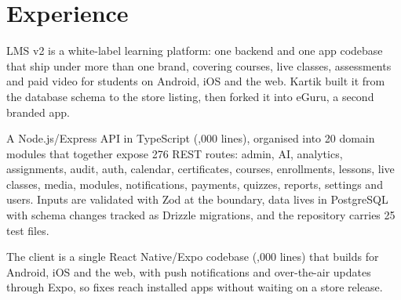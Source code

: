 \section{Experience}\label{sec:exp}


\begin{facts}
\end{facts}

 LMS v2 is a white-label learning platform: one backend and one app codebase that
ship under more than one brand, covering courses, live classes, assessments and paid video for
students on Android, iOS and the web. Kartik built it from the database schema to the store
listing, then forked it into eGuru, a second branded app.

 A Node.js/Express API in TypeScript (,000 lines), organised into
20 domain modules that together expose 276 REST routes: admin, AI, analytics, assignments, audit,
auth, calendar, certificates, courses, enrollments, lessons, live classes, media, modules,
notifications, payments, quizzes, reports, settings and users. Inputs are validated with Zod at the
boundary, data lives in PostgreSQL with schema changes tracked as Drizzle migrations, and the
repository carries 25 test files.

 The client is a single React Native/Expo codebase (,000
lines) that builds for Android, iOS and the web, with push notifications and over-the-air updates
through Expo, so fixes reach installed apps without waiting on a store release.

